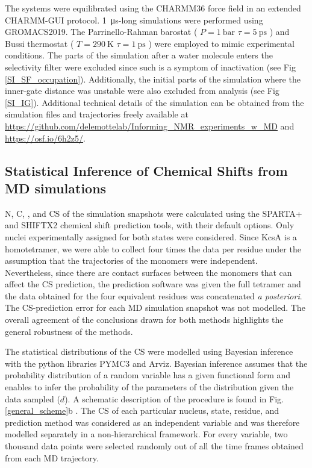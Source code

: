 \documentclass[%
 aip,
 amsmath,amssymb,
 preprint,%
]{revtex4-1}
\newcommand{\ca}{\ce{C_\alpha} }
\newcommand{\cb}{\ce{C_\beta} }
\begin{document}
The systems were equilibrated using the CHARMM36 force field\cite{Best2012} in an extended CHARMM-GUI protocol. \SI{1}{\micro\second}-long simulations were performed using GROMACS2019\cite{GROMACS_Abraham2015}. The Parrinello-Rahman barostat\cite{Parrinello1981} ( $P=\SI{1}{\bar}$ $\tau = \SI{5}{\pico\second}$  ) and Bussi thermostat\cite{Bussi2007} ( $T=\SI{290}{\kelvin}$ $\tau = \SI{1}{\pico\second}$  ) were employed to mimic experimental conditions. The parts of the simulation after a water molecule enters the selectivity filter were excluded since such is a symptom of inactivation (see Fig \ref{SI_SF_occupation})\cite{Furini2020}. Additionally, the initial parts of the simulation where the inner-gate distance was unstable were also excluded from analysis (see Fig \ref{SI_IG}). Additional technical details of the simulation can be obtained from the simulation files and trajectories freely available at \url{https://github.com/delemottelab/Informing_NMR_experiments_w_MD} and \url{https://osf.io/6h2z5/}. 

\subsection{Statistical Inference of Chemical Shifts from MD simulations}

N, C, \ca, and \cb CS of the simulation snapshots were calculated using the SPARTA+\cite{Shen2010} and SHIFTX2\cite{Han2011} chemical shift prediction tools, with their default options. Only nuclei experimentally assigned for both states were considered. Since KcsA is a homotetramer, we were able to collect four times the data per residue under the assumption that the trajectories of the monomers were independent. Nevertheless, since there are contact surfaces between the monomers that can affect the CS prediction, the prediction software was given the full tetramer and the data obtained for the four equivalent residues was concatenated \textit{a posteriori}. The CS-prediction error for each MD simulation snapshot was not modelled. The overall agreement of the conclusions drawn for both methods highlights the general robustness of the methods. 

The statistical distributions of the CS were modelled using Bayesian inference with the python libraries PYMC3\cite{Salvatier2016} and Arviz\cite{arviz_2019}. Bayesian inference assumes that the probability distribution of a random variable has a given functional form and enables to infer the probability of the parameters of the distribution given the data sampled ($d$). A schematic description of the procedure is found in Fig. \ref{general_scheme}b . The CS of each particular nucleus, state, residue, and prediction method was considered as an independent variable and was therefore modelled separately in a non-hierarchical framework. For every variable, two thousand data points were selected randomly out of all the time frames obtained from each MD trajectory. 
\end{document}

